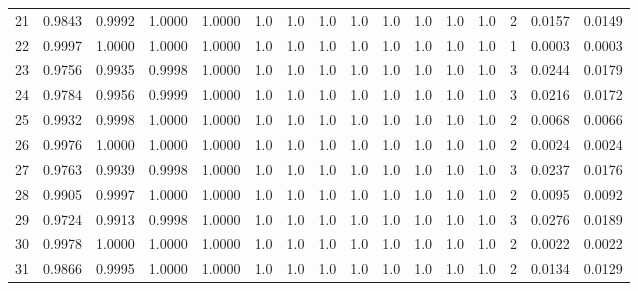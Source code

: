 \begin{tabular}{lrrrrrrrrrrrrrrr}
21  &      0.9843 &  0.9992 &  1.0000 &  1.0000 &     1.0 &     1.0 &     1.0 &     1.0 &     1.0 &     1.0 &      1.0 &        1.0 &      2 &                    0.0157 &                     0.0149 \\
22  &      0.9997 &  1.0000 &  1.0000 &  1.0000 &     1.0 &     1.0 &     1.0 &     1.0 &     1.0 &     1.0 &      1.0 &        1.0 &      1 &                    0.0003 &                     0.0003 \\
23  &      0.9756 &  0.9935 &  0.9998 &  1.0000 &     1.0 &     1.0 &     1.0 &     1.0 &     1.0 &     1.0 &      1.0 &        1.0 &      3 &                    0.0244 &                     0.0179 \\
24  &      0.9784 &  0.9956 &  0.9999 &  1.0000 &     1.0 &     1.0 &     1.0 &     1.0 &     1.0 &     1.0 &      1.0 &        1.0 &      3 &                    0.0216 &                     0.0172 \\
25  &      0.9932 &  0.9998 &  1.0000 &  1.0000 &     1.0 &     1.0 &     1.0 &     1.0 &     1.0 &     1.0 &      1.0 &        1.0 &      2 &                    0.0068 &                     0.0066 \\
26  &      0.9976 &  1.0000 &  1.0000 &  1.0000 &     1.0 &     1.0 &     1.0 &     1.0 &     1.0 &     1.0 &      1.0 &        1.0 &      2 &                    0.0024 &                     0.0024 \\
27  &      0.9763 &  0.9939 &  0.9998 &  1.0000 &     1.0 &     1.0 &     1.0 &     1.0 &     1.0 &     1.0 &      1.0 &        1.0 &      3 &                    0.0237 &                     0.0176 \\
28  &      0.9905 &  0.9997 &  1.0000 &  1.0000 &     1.0 &     1.0 &     1.0 &     1.0 &     1.0 &     1.0 &      1.0 &        1.0 &      2 &                    0.0095 &                     0.0092 \\
29  &      0.9724 &  0.9913 &  0.9998 &  1.0000 &     1.0 &     1.0 &     1.0 &     1.0 &     1.0 &     1.0 &      1.0 &        1.0 &      3 &                    0.0276 &                     0.0189 \\
30  &      0.9978 &  1.0000 &  1.0000 &  1.0000 &     1.0 &     1.0 &     1.0 &     1.0 &     1.0 &     1.0 &      1.0 &        1.0 &      2 &                    0.0022 &                     0.0022 \\
31  &      0.9866 &  0.9995 &  1.0000 &  1.0000 &     1.0 &     1.0 &     1.0 &     1.0 &     1.0 &     1.0 &      1.0 &        1.0 &      2 &                    0.0134 &                     0.0129 \\

\end{tabular}
